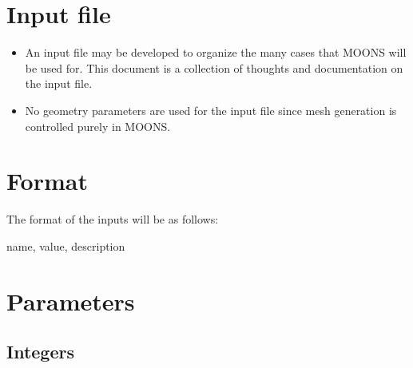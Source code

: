 \documentclass[11pt]{article}
\begin{document}
\doublespacing
\MOONSTITLE
\maketitle

\section{Input file}

\begin{itemize}
\item An input file may be developed to organize the many cases that MOONS will be used for. This document is a collection of thoughts and documentation on the input file.
\item No geometry parameters are used for the input file since mesh generation is controlled purely in MOONS.
\end{itemize}



\section{Format}
The format of the inputs will be as follows:

name, value, description

\section{Parameters}
\subsection{Integers}
\end{document}
